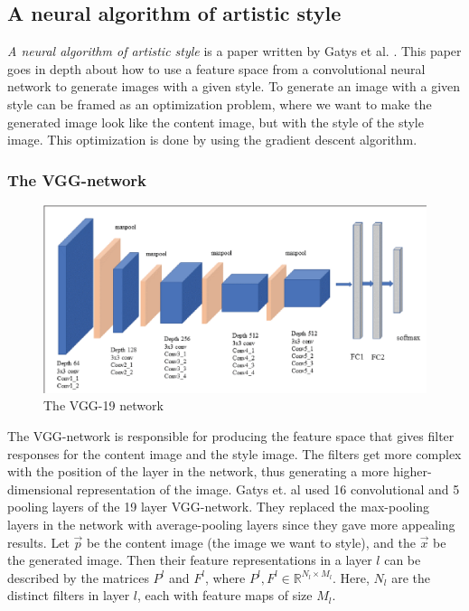 \subsection{A neural algorithm of artistic style}
\label{sec:gatys}
\textit{A neural algorithm of artistic style} is a paper written by Gatys et al. \cite{Gatys:1}. This paper goes in depth about how to use a feature space from a convolutional neural network to generate images with a given style. To generate an image with a given style can be framed as an optimization problem, where we want to make the generated image look like the content image, but with the style of the style image. This optimization is done by using the gradient descent algorithm.
\subsubsection{The VGG-network}
\label{sec:vgg}
\begin{figure}[!ht]
\begin{center}
\includegraphics[scale=0.20]{report/Background/images/vgg19.png}
\caption{The VGG-19 network}
\label{fig:rotasjon}
\end{center}
\end{figure}
The VGG-network is responsible for producing the feature space that gives filter responses for the content image and the style image. The filters get more complex with the position of the layer in the network, thus generating a more higher-dimensional representation of the image. Gatys et. al used 16 convolutional and 5 pooling layers of the 19 layer VGG-network. They replaced the max-pooling layers in the network with average-pooling layers since they gave more appealing results. \newline\newline
Let $\vec{p}$ be the content image (the image we want to style), and the $\vec{x}$ be the generated image. Then their feature representations in a layer $l$ can be described by the matrices $P^l$ and $F^l$, where $P^l, F^l\in\mathbb{R}^{N_l\times M_l}$. Here, $N_l$ are the distinct filters in layer $l$, each with feature maps of size $M_l$. 
